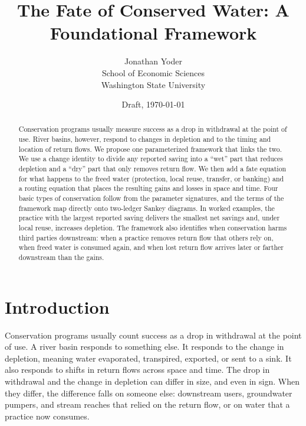 \documentclass[11pt]{article}
\title{The Fate of Conserved Water: A Foundational Framework}
\author{Jonathan Yoder\\School of Economic Sciences\\Washington State University}
\date{Draft, \today}
\begin{document}
\maketitle

\begin{abstract}
Conservation programs usually measure success as a drop in withdrawal at the point of use. River basins, however, respond to changes in depletion and to the timing and location of return flows. We propose one parameterized framework that links the two. We use a change identity to divide any reported saving into a ``wet'' part that reduces depletion and a ``dry'' part that only removes return flow. We then add a fate equation for what happens to the freed water (protection, local reuse, transfer, or banking) and a routing equation that places the resulting gains and losses in space and time. Four basic types of conservation follow from the parameter signatures, and the terms of the framework map directly onto two-ledger Sankey diagrams. In worked examples, the practice with the largest reported saving delivers the smallest net savings and, under local reuse, increases depletion. The framework also identifies when conservation harms third parties downstream: when a practice removes return flow that others rely on, when freed water is consumed again, and when lost return flow arrives later or farther downstream than the gains.
\end{abstract}

\clearpage
\doublespacing

\section{Introduction}\label{sec:intro}

Conservation programs usually count success as a drop in withdrawal at the point of use. A river basin responds to something else. It responds to the change in depletion, meaning water evaporated, transpired, exported, or sent to a sink. It also responds to shifts in return flows across space and time. The drop in withdrawal and the change in depletion can differ in size, and even in sign. When they differ, the difference falls on someone else: downstream users, groundwater pumpers, and stream reaches that relied on the return flow, or on water that a practice now consumes.
\end{document}
